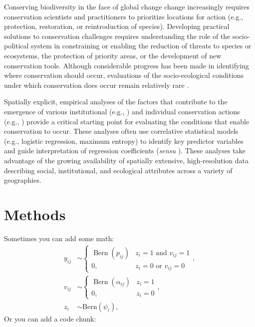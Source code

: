\documentclass[11pt,]{article}
\begin{document}
Conserving biodiversity in the face of global change change increasingly
requires conservation scientists and practitioners to prioritize
locations for action (e.g., protection, restoration, or reintroduction
of species). Developing practical solutions to conservation challenges
requires understanding the role of the socio-political system in
constraining or enabling the reduction of threats to species or
ecosystems, the protection of priority areas, or the development of new
conservation tools. Although considerable progress has been made in
identifying where conservation should occur, evaluations of the
socio-ecological conditions under which conservation does occur remain
relatively rare \citep{williamson2018, ban2013}.

Spatially explicit, empirical analyses of the factors that contribute to
the emergence of various institutional (e.g., \citep{lubell2002ws}) and
individual conservation actions (e.g., \citep{metcalf2019, nielsen2017})
provide a critical starting point for evaluating the conditions that
enable conservation to occur. These analyses often use correlative
statistical models (e.g., logistic regression, maximum entropy) to
identify key predictor variables and guide interpretation of regression
coefficients (\textit{sensu} \citealp{lubell2002ws, kroetz2014}). These
analyses take advantage of the growing availability of spatially
extensive, high-resolution data describing social, institutional, and
ecological attributes across a variety of geographies.

\hypertarget{methods}{%
\section{Methods}\label{methods}}

Sometimes you can add some math: \[
\begin{aligned}
y_{ij} &\sim \begin{cases}\operatorname{Bern}(p_{ij}) & z_{i} = 1 \text{ and } v_{ij} = 1\\
0,& z_{i} = 0 \text{ or } v_{ij} = 0
\end{cases},\\
v_{ij} &\sim \begin{cases} \operatorname{Bern}(\alpha_{ij}) & z_{i}=1\\
0, &z_{i} = 0
\end{cases},\\
z_i &\sim \mathrm{Bern}(\psi_i),
\end{aligned}
\] Or you can add a code chunk:
\end{document}
